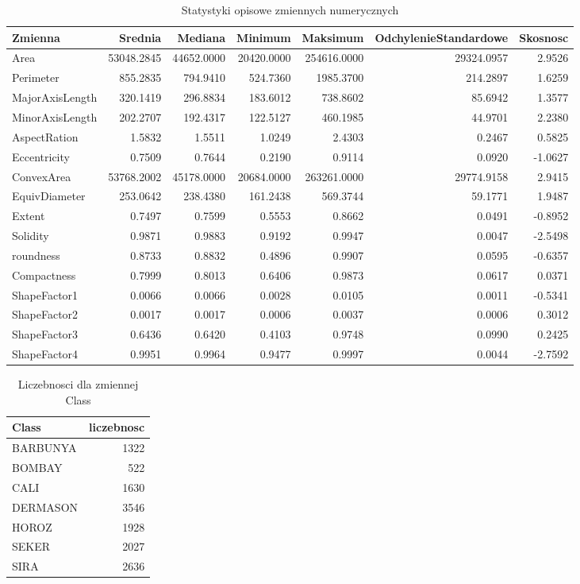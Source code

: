 \begin{table}[H]

\caption{\label{tab:statystyki-opisowe-numeryczne}Statystyki opisowe zmiennych numerycznych}
\centering
\begin{tabular}[t]{lrrrrrr}
\toprule
Zmienna & Srednia & Mediana & Minimum & Maksimum & OdchylenieStandardowe & Skosnosc\\
\midrule
Area & 53048.2845 & 44652.0000 & 20420.0000 & 254616.0000 & 29324.0957 & 2.9526\\
Perimeter & 855.2835 & 794.9410 & 524.7360 & 1985.3700 & 214.2897 & 1.6259\\
MajorAxisLength & 320.1419 & 296.8834 & 183.6012 & 738.8602 & 85.6942 & 1.3577\\
MinorAxisLength & 202.2707 & 192.4317 & 122.5127 & 460.1985 & 44.9701 & 2.2380\\
AspectRation & 1.5832 & 1.5511 & 1.0249 & 2.4303 & 0.2467 & 0.5825\\
\addlinespace
Eccentricity & 0.7509 & 0.7644 & 0.2190 & 0.9114 & 0.0920 & -1.0627\\
ConvexArea & 53768.2002 & 45178.0000 & 20684.0000 & 263261.0000 & 29774.9158 & 2.9415\\
EquivDiameter & 253.0642 & 238.4380 & 161.2438 & 569.3744 & 59.1771 & 1.9487\\
Extent & 0.7497 & 0.7599 & 0.5553 & 0.8662 & 0.0491 & -0.8952\\
Solidity & 0.9871 & 0.9883 & 0.9192 & 0.9947 & 0.0047 & -2.5498\\
\addlinespace
roundness & 0.8733 & 0.8832 & 0.4896 & 0.9907 & 0.0595 & -0.6357\\
Compactness & 0.7999 & 0.8013 & 0.6406 & 0.9873 & 0.0617 & 0.0371\\
ShapeFactor1 & 0.0066 & 0.0066 & 0.0028 & 0.0105 & 0.0011 & -0.5341\\
ShapeFactor2 & 0.0017 & 0.0017 & 0.0006 & 0.0037 & 0.0006 & 0.3012\\
ShapeFactor3 & 0.6436 & 0.6420 & 0.4103 & 0.9748 & 0.0990 & 0.2425\\
\addlinespace
ShapeFactor4 & 0.9951 & 0.9964 & 0.9477 & 0.9997 & 0.0044 & -2.7592\\
\bottomrule
\end{tabular}
\end{table}

\begin{table}[H]

\caption{\label{tab:liczebnosci-Class}Liczebnosci dla zmiennej Class}
\centering
\begin{tabular}[t]{lr}
\toprule
Class & liczebnosc\\
\midrule
BARBUNYA & 1322\\
BOMBAY & 522\\
CALI & 1630\\
DERMASON & 3546\\
HOROZ & 1928\\
\addlinespace
SEKER & 2027\\
SIRA & 2636\\
\bottomrule
\end{tabular}
\end{table}

